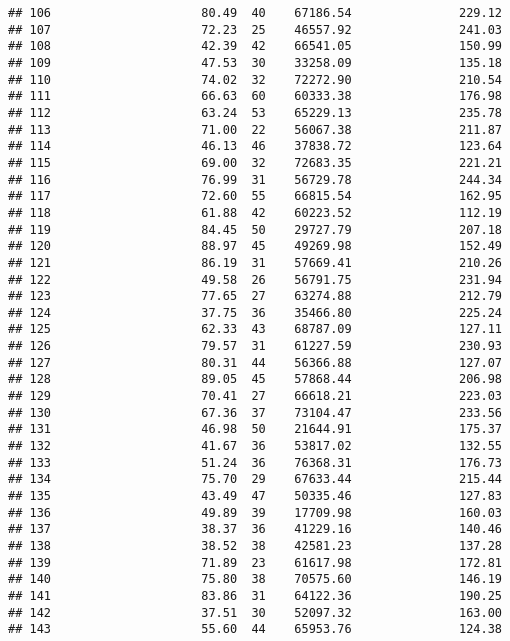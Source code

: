 \documentclass[
]{article}
\begin{document}
\begin{verbatim}
## 106                     80.49  40    67186.54               229.12
## 107                     72.23  25    46557.92               241.03
## 108                     42.39  42    66541.05               150.99
## 109                     47.53  30    33258.09               135.18
## 110                     74.02  32    72272.90               210.54
## 111                     66.63  60    60333.38               176.98
## 112                     63.24  53    65229.13               235.78
## 113                     71.00  22    56067.38               211.87
## 114                     46.13  46    37838.72               123.64
## 115                     69.00  32    72683.35               221.21
## 116                     76.99  31    56729.78               244.34
## 117                     72.60  55    66815.54               162.95
## 118                     61.88  42    60223.52               112.19
## 119                     84.45  50    29727.79               207.18
## 120                     88.97  45    49269.98               152.49
## 121                     86.19  31    57669.41               210.26
## 122                     49.58  26    56791.75               231.94
## 123                     77.65  27    63274.88               212.79
## 124                     37.75  36    35466.80               225.24
## 125                     62.33  43    68787.09               127.11
## 126                     79.57  31    61227.59               230.93
## 127                     80.31  44    56366.88               127.07
## 128                     89.05  45    57868.44               206.98
## 129                     70.41  27    66618.21               223.03
## 130                     67.36  37    73104.47               233.56
## 131                     46.98  50    21644.91               175.37
## 132                     41.67  36    53817.02               132.55
## 133                     51.24  36    76368.31               176.73
## 134                     75.70  29    67633.44               215.44
## 135                     43.49  47    50335.46               127.83
## 136                     49.89  39    17709.98               160.03
## 137                     38.37  36    41229.16               140.46
## 138                     38.52  38    42581.23               137.28
## 139                     71.89  23    61617.98               172.81
## 140                     75.80  38    70575.60               146.19
## 141                     83.86  31    64122.36               190.25
## 142                     37.51  30    52097.32               163.00
## 143                     55.60  44    65953.76               124.38

\end{verbatim}
\end{document}
